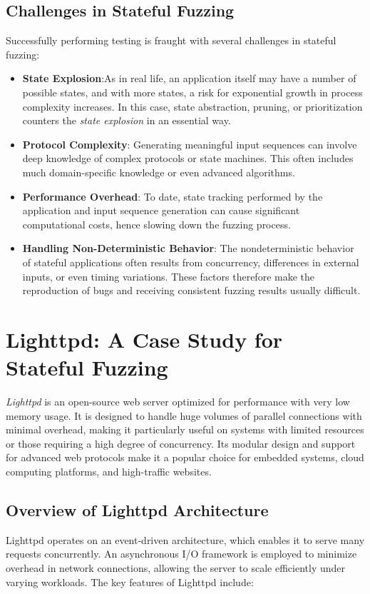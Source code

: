 \subsection{Challenges in Stateful Fuzzing}
Successfully performing testing is fraught with several challenges in stateful fuzzing:

\begin{itemize}
    \item \textbf{State Explosion}:As in real life, an application itself may have a number of possible states, and with more states, a risk for exponential growth in process complexity increases. In this case, state abstraction, pruning, or prioritization counters the \textit{state explosion} in an essential way.
    
    \item \textbf{Protocol Complexity}: Generating meaningful input sequences can involve deep knowledge of complex protocols or state machines. This often includes much domain-specific knowledge or even advanced algorithms.
    
    \item \textbf{Performance Overhead}: To date, state tracking performed by the application and input sequence generation can cause significant computational costs, hence slowing down the fuzzing process.

    \item \textbf{Handling Non-Deterministic Behavior}: The nondeterministic behavior of stateful applications often results from concurrency, differences in external inputs, or even timing variations. These factors therefore make the reproduction of bugs and receiving consistent fuzzing results usually difficult.

\end{itemize}

\section{Lighttpd: A Case Study for Stateful Fuzzing}
\textit{Lighttpd} is an open-source web server optimized for performance with very low memory usage. It is designed to handle huge volumes of parallel connections with minimal overhead, making it particularly useful on systems with limited resources or those requiring a high degree of concurrency. Its modular design and support for advanced web protocols make it a popular choice for embedded systems, cloud computing platforms, and high-traffic websites.

\subsection{Overview of Lighttpd Architecture}
Lighttpd operates on an event-driven architecture, which enables it to serve many requests concurrently. An asynchronous I/O framework is employed to minimize overhead in network connections, allowing the server to scale efficiently under varying workloads. The key features of Lighttpd include:

